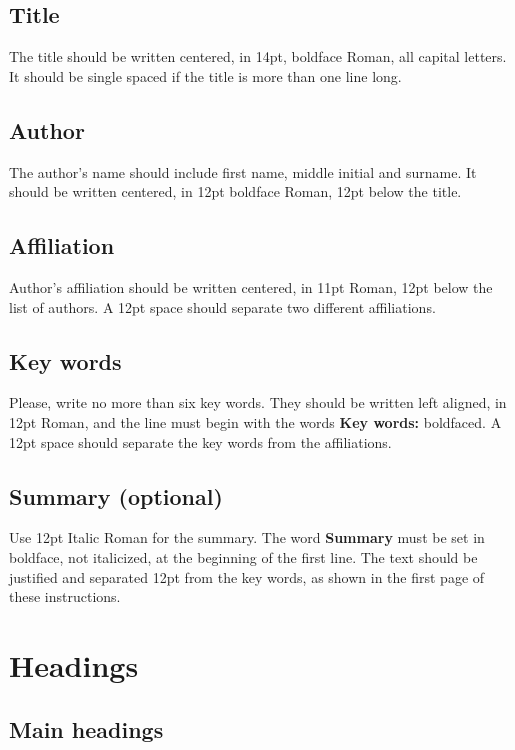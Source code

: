\documentclass{WCCM-ECCOMAS_2026_Full_Paper}
\begin{document}
\subsection{Title}

The title should be written centered, in 14pt, boldface Roman, all capital letters. It should be single spaced if the title is more than one line long.

\subsection{Author}

The author's name should include first name, middle initial and surname. It should be written centered, in 12pt boldface Roman, 12pt below the title.

\subsection{Affiliation}

Author's affiliation should be written centered, in 11pt Roman, 12pt below the list of authors. A 12pt space should separate two different affiliations.

\subsection{Key words}

Please, write no more than six key words. They should be written left aligned, in 12pt Roman, and the line must begin with the words \textbf{Key words:} boldfaced. A 12pt space should separate the key words from the affiliations.

\subsection{Summary (optional)}

Use 12pt Italic Roman for the summary. The word \textbf{Summary} must be set in boldface, not italicized, at the beginning of the first line. The text should be justified and separated 12pt from the key words, as shown in the first page of these instructions.

\section{Headings}

\subsection{Main headings}
\end{document}
